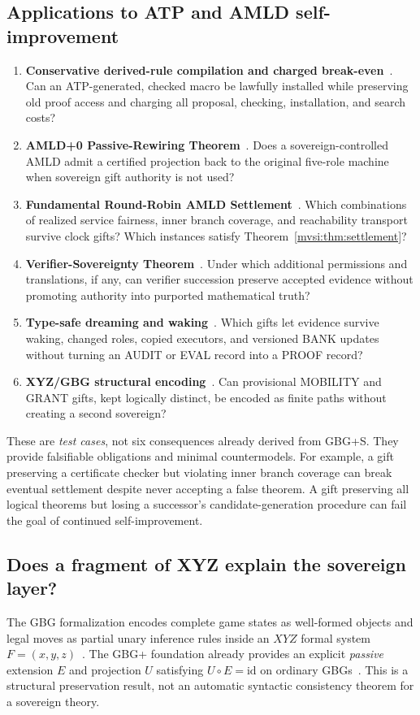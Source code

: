 \documentclass[11pt,letterpaper]{article}
\theoremstyle{definition}\newtheorem{definition}[theorem]{Definition}\newtheorem{example}[theorem]{Example}
\theoremstyle{remark}\newtheorem{remark}[theorem]{Remark}
\begin{document}
\subsection{Applications to ATP and AMLD self-improvement}
\begin{enumerate}[label=\arabic*.,leftmargin=1.8em,itemsep=0.45em]
\item \textbf{Conservative derived-rule compilation and charged break-even}~\cite{mvsi:Successor}. Can an ATP-generated, checked macro be lawfully installed while preserving old proof access and charging all proposal, checking, installation, and search costs?
\item \textbf{AMLD+0 Passive-Rewiring Theorem}~\cite{mvsi:AMLD0}. Does a sovereign-controlled AMLD admit a certified projection back to the original five-role machine when sovereign gift authority is not used?
\item \textbf{Fundamental Round-Robin AMLD Settlement}~\cite{mvsi:RoundRobin}. Which combinations of realized service fairness, inner branch coverage, and reachability transport survive clock gifts? Which instances satisfy Theorem~\ref{mvsi:thm:settlement}?
\item \textbf{Verifier-Sovereignty Theorem}~\cite{mvsi:Graduation}. Under which additional permissions and translations, if any, can verifier succession preserve accepted evidence without promoting authority into purported mathematical truth?
\item \textbf{Type-safe dreaming and waking}~\cite{mvsi:Dreaming}. Which gifts let evidence survive waking, changed roles, copied executors, and versioned BANK updates without turning an AUDIT or EVAL record into a PROOF record?
\item \textbf{XYZ/GBG structural encoding}~\cite{mvsi:GBG,mvsi:GBGp}. Can provisional MOBILITY and GRANT gifts, kept logically distinct, be encoded as finite paths without creating a second sovereign?
\end{enumerate}

These are \emph{test cases}, not six consequences already derived from GBG+S. They provide falsifiable obligations and minimal countermodels. For example, a gift preserving a certificate checker but violating inner branch coverage can break eventual settlement despite never accepting a false theorem. A gift preserving all logical theorems but losing a successor's candidate-generation procedure can fail the goal of continued self-improvement.

\subsection{Does a fragment of XYZ explain the sovereign layer?}
The GBG formalization encodes complete game states as well-formed objects and legal moves as partial unary inference rules inside an $XYZ$ formal system $F=(x,y,z)$~\cite{mvsi:GBG,mvsi:GBGp}. The GBG+ foundation already provides an explicit \emph{passive} extension $E$ and projection $U$ satisfying $U\circ E=\mathrm{id}$ on ordinary GBGs~\cite{mvsi:GBGp}. This is a structural preservation result, not an automatic syntactic consistency theorem for a sovereign theory.
\end{document}
